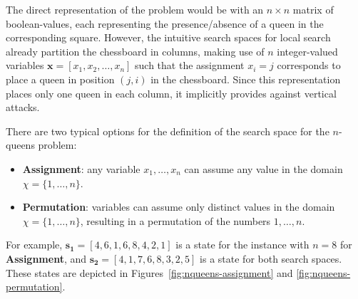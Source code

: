 The direct representation of the problem would be with an $n\times n$
matrix of boolean-values, each representing the presence/absence of a
queen in the corresponding square. However, the intuitive search
spaces for local search already partition the chessboard in columns,
making use of $n$ integer-valued variables $\mathbf{x} = [x_1, x_2,
\dots, x_n]$ such that the assignment $x_i = j$ corresponds to place a
queen in position $(j,i)$ in the chessboard. Since this representation
places only one queen in each column, it implicitly provides against
vertical attacks.

There are two typical options for the definition of the
search space for the $n$-queens problem:

\begin{itemize}
\item \textbf{Assignment}: any variable $x_1,\dots, x_n$ can assume
  any value in the domain $\chi = \{1,\dots,n\}$. 
\item \textbf{Permutation}: variables can assume only distinct values in the domain $\chi = \{1,\dots,n\}$, resulting in a permutation of the numbers $1,\dots,n$. 
\end{itemize}

For example, $\mathbf{s_1} = [4,6,1,6,8,4,2,1]$ is a state for the instance with
$n = 8$ for \textbf{Assignment}, and $\mathbf{s_2} = [4,1,7,6,8,3,2,5]$ is a
state for both search spaces. These states are depicted in Figures~\ref{fig:nqueens-assignment} and \ref{fig:nqueens-permutation}.

